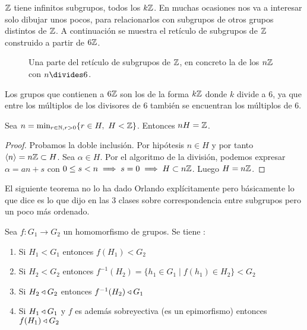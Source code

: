\begin{ej}
	$\mathbb{Z}$ tiene infinitos subgrupos, todos los $k\mathbb{Z}$. En muchas ocasiones nos va a interesar solo dibujar unos pocos, para relacionarlos con subgrupos de otros grupos distintos de $\mathbb{Z}$. A continuación se muestra el retículo de subgrupos de $\mathbb{Z}$ construido a partir de $6\mathbb{Z}$.
	
	\begin{figure}[h]
		\centering
		\caption{Una parte del retículo de subgrupos de $\mathbb{Z}$, en concreto la de los $n\mathbb{Z}$ con $n \divides 6$.}
	\end{figure}

	Los grupos que contienen a $6\mathbb{Z}$ son los de la forma $k\mathbb{Z}$ donde $k$ divide a $6$, ya que entre los múltiplos de los divisores de $6$ también se encuentran los múltiplos de $6$.
\end{ej}

\begin{pro}
	Sea $n = \min_{r \in \mathbb{N},\\r > 0} \{ r \in H,\ H < \mathbb{Z}\}$. Entonces $nH = \mathbb{Z}$.
\end{pro}
\begin{proof}
	Probamos la doble inclusión. Por hipótesis $n \in H$ y por tanto $\langle n \rangle = n\mathbb{Z} \subset H$. Sea $\alpha \in H$. Por el algoritmo de la división, podemos expresar $\alpha = an + s$ con $0 \leq s < n \implies s = 0 \implies H \subset n\mathbb{Z}$. Luego $H = n\mathbb{Z}$.
\end{proof}

El siguiente teorema no lo ha dado Orlando explícitamente pero básicamente lo que dice es lo que dijo en las 3 clases sobre correspondencia entre subgrupos pero un poco más ordenado.

\begin{thm}
	Sea $f:G_1 \to G_2$ un homomorfismo de grupos. Se tiene \cite{dor96}:
	\begin{enumerate}
		\item Si $H_1 < G_1$ entonces $f(H_1) < G_2$
		\item Si $H_2 < G_2$ entonces $f^{-1}(H_2) = \{h_1 \in G_1 \mid f(h_1) \in H_2\} < G_2$
		\item Si $H_2 \mathbin{\triangleleft} G_2$ entonces $f^{-1}(H_2) \mathbin{\triangleleft} G_1$
		\item Si $H_1 \mathbin{\triangleleft} G_1$ y $f$ es además sobreyectiva (es un epimorfismo) entonces $f(H_1) \mathbin{\triangleleft} G_2$
	\end{enumerate}
\end{thm}

